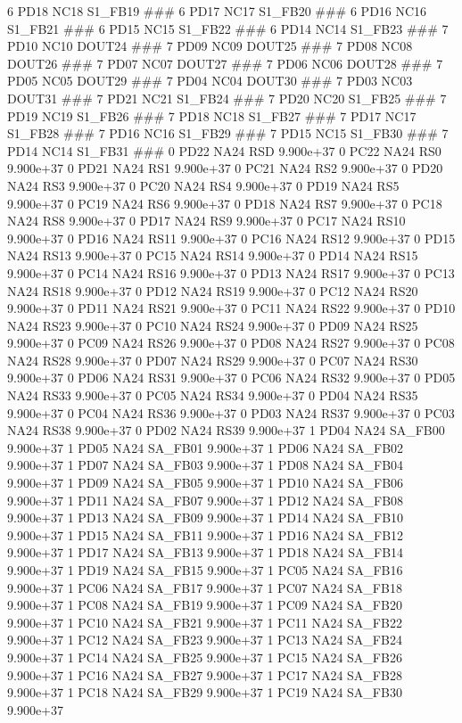 6 PD18 NC18 S1_FB19 ### 
6 PD17 NC17 S1_FB20 ### 
6 PD16 NC16 S1_FB21 ### 
6 PD15 NC15 S1_FB22 ### 
6 PD14 NC14 S1_FB23 ### 
7 PD10 NC10 DOUT24 ### 
7 PD09 NC09 DOUT25 ### 
7 PD08 NC08 DOUT26 ### 
7 PD07 NC07 DOUT27 ### 
7 PD06 NC06 DOUT28 ### 
7 PD05 NC05 DOUT29 ### 
7 PD04 NC04 DOUT30 ### 
7 PD03 NC03 DOUT31 ### 
7 PD21 NC21 S1_FB24 ### 
7 PD20 NC20 S1_FB25 ### 
7 PD19 NC19 S1_FB26 ### 
7 PD18 NC18 S1_FB27 ### 
7 PD17 NC17 S1_FB28 ### 
7 PD16 NC16 S1_FB29 ### 
7 PD15 NC15 S1_FB30 ### 
7 PD14 NC14 S1_FB31 ### 
0 PD22 NA24 RSD 9.900e+37 
0 PC22 NA24 RS0 9.900e+37 
0 PD21 NA24 RS1 9.900e+37 
0 PC21 NA24 RS2 9.900e+37 
0 PD20 NA24 RS3 9.900e+37 
0 PC20 NA24 RS4 9.900e+37 
0 PD19 NA24 RS5 9.900e+37 
0 PC19 NA24 RS6 9.900e+37 
0 PD18 NA24 RS7 9.900e+37 
0 PC18 NA24 RS8 9.900e+37 
0 PD17 NA24 RS9 9.900e+37 
0 PC17 NA24 RS10 9.900e+37 
0 PD16 NA24 RS11 9.900e+37 
0 PC16 NA24 RS12 9.900e+37 
0 PD15 NA24 RS13 9.900e+37 
0 PC15 NA24 RS14 9.900e+37 
0 PD14 NA24 RS15 9.900e+37 
0 PC14 NA24 RS16 9.900e+37 
0 PD13 NA24 RS17 9.900e+37 
0 PC13 NA24 RS18 9.900e+37 
0 PD12 NA24 RS19 9.900e+37 
0 PC12 NA24 RS20 9.900e+37 
0 PD11 NA24 RS21 9.900e+37 
0 PC11 NA24 RS22 9.900e+37 
0 PD10 NA24 RS23 9.900e+37 
0 PC10 NA24 RS24 9.900e+37 
0 PD09 NA24 RS25 9.900e+37 
0 PC09 NA24 RS26 9.900e+37 
0 PD08 NA24 RS27 9.900e+37 
0 PC08 NA24 RS28 9.900e+37 
0 PD07 NA24 RS29 9.900e+37 
0 PC07 NA24 RS30 9.900e+37 
0 PD06 NA24 RS31 9.900e+37 
0 PC06 NA24 RS32 9.900e+37 
0 PD05 NA24 RS33 9.900e+37 
0 PC05 NA24 RS34 9.900e+37 
0 PD04 NA24 RS35 9.900e+37 
0 PC04 NA24 RS36 9.900e+37 
0 PD03 NA24 RS37 9.900e+37 
0 PC03 NA24 RS38 9.900e+37 
0 PD02 NA24 RS39 9.900e+37 
1 PD04 NA24 SA_FB00 9.900e+37 
1 PD05 NA24 SA_FB01 9.900e+37 
1 PD06 NA24 SA_FB02 9.900e+37 
1 PD07 NA24 SA_FB03 9.900e+37 
1 PD08 NA24 SA_FB04 9.900e+37 
1 PD09 NA24 SA_FB05 9.900e+37 
1 PD10 NA24 SA_FB06 9.900e+37 
1 PD11 NA24 SA_FB07 9.900e+37 
1 PD12 NA24 SA_FB08 9.900e+37 
1 PD13 NA24 SA_FB09 9.900e+37 
1 PD14 NA24 SA_FB10 9.900e+37 
1 PD15 NA24 SA_FB11 9.900e+37 
1 PD16 NA24 SA_FB12 9.900e+37 
1 PD17 NA24 SA_FB13 9.900e+37 
1 PD18 NA24 SA_FB14 9.900e+37 
1 PD19 NA24 SA_FB15 9.900e+37 
1 PC05 NA24 SA_FB16 9.900e+37 
1 PC06 NA24 SA_FB17 9.900e+37 
1 PC07 NA24 SA_FB18 9.900e+37 
1 PC08 NA24 SA_FB19 9.900e+37 
1 PC09 NA24 SA_FB20 9.900e+37 
1 PC10 NA24 SA_FB21 9.900e+37 
1 PC11 NA24 SA_FB22 9.900e+37 
1 PC12 NA24 SA_FB23 9.900e+37 
1 PC13 NA24 SA_FB24 9.900e+37 
1 PC14 NA24 SA_FB25 9.900e+37 
1 PC15 NA24 SA_FB26 9.900e+37 
1 PC16 NA24 SA_FB27 9.900e+37 
1 PC17 NA24 SA_FB28 9.900e+37 
1 PC18 NA24 SA_FB29 9.900e+37 
1 PC19 NA24 SA_FB30 9.900e+37 
